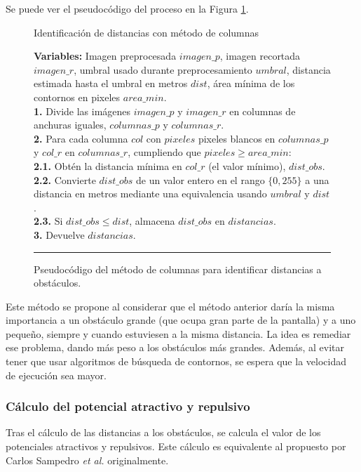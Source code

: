 \begin{itemize}
Se puede ver el pseudocódigo del proceso en la Figura \ref{alg:column}.

\begin{figure}[h]
\begin{algorithm}[H]
\caption{Identificación de distancias con método de columnas}
\textbf{Variables:} Imagen preprocesada $imagen\_p$, imagen recortada $imagen\_r$, umbral usado durante preprocesamiento $umbral$, distancia estimada hasta el umbral en metros $dist$, área mínima de los contornos en pixeles $area\_min$.\\
\textbf{1.} Divide las imágenes $imagen\_p$ y $imagen\_r$ en columnas de anchuras iguales, $columnas\_p$ y $columnas\_r$.\\
\textbf{2.} Para cada columna $col$ con $pixeles$ pixeles blancos en $columnas\_p$ y $col\_r$ en $columnas\_r$, cumpliendo que $pixeles \geq area\_min$:\\
\Indp\textbf{2.1.} Obtén la distancia mínima en $col\_r$ (el valor mínimo), $dist\_obs$.\\
\textbf{2.2.} Convierte $dist\_obs$ de un valor entero en el rango $\{0, 255\}$ a una distancia en metros mediante una equivalencia usando $umbral$ y $dist$.\\
\textbf{2.3.} Si $dist\_obs \leq dist$, almacena $dist\_obs$ en $distancias$.\\
\Indm \textbf{3.} Devuelve $distancias$.
\end{algorithm}
\hrule
\caption{Pseudocódigo del método de columnas para identificar distancias a obstáculos.}
\label{alg:column}
\end{figure}

Este método se propone al considerar que el método anterior daría la misma importancia a un obstáculo grande (que ocupa gran parte de la pantalla) y a uno pequeño, siempre y cuando estuviesen a la misma distancia. La idea es remediar ese problema, dando más peso a los obstáculos más grandes. Además, al evitar tener que usar algoritmos de búsqueda de contornos, se espera que la velocidad de ejecución sea mayor.

\end{itemize}

\subsubsection{Cálculo del potencial atractivo y repulsivo}

Tras el cálculo de las distancias a los obstáculos, se calcula el valor de los potenciales atractivos y repulsivos. Este cálculo es equivalente al propuesto por Carlos Sampedro \textit{et al.} \cite{Sampedro2018} originalmente.

